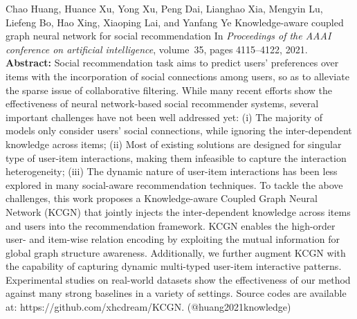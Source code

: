 \documentclass{article}
\begin{document}
\begin{thebibliography}{}
 Chao Huang, Huance Xu, Yong Xu, Peng Dai, Lianghao Xia, Mengyin Lu, Liefeng Bo, Hao Xing, Xiaoping Lai, and Yanfang Ye \newblock Knowledge-aware coupled graph neural network for social recommendation \newblock In {\em Proceedings of the AAAI conference on artificial intelligence}, volume~35, pages 4115--4122, 2021. \newblock \textbf{Abstract:} Social recommendation task aims to predict users' preferences over items with the incorporation of social connections among users, so as to alleviate the sparse issue of collaborative filtering. While many recent efforts show the effectiveness of neural network-based social recommender systems, several important challenges have not been well addressed yet: (i) The majority of models only consider users’ social connections, while ignoring the inter-dependent knowledge across items; (ii) Most of existing solutions are designed for singular type of user-item interactions, making them infeasible to capture the interaction heterogeneity; (iii) The dynamic nature of user-item interactions has been less explored in many social-aware recommendation techniques. To tackle the above challenges, this work proposes a Knowledge-aware Coupled Graph Neural Network (KCGN) that jointly injects the inter-dependent knowledge across items and users into the recommendation framework. KCGN enables the high-order user- and item-wise relation encoding by exploiting the mutual information for global graph structure awareness. Additionally, we further augment KCGN with the capability of capturing dynamic multi-typed user-item interactive patterns. Experimental studies on real-world datasets show the effectiveness of our method against many strong baselines in a variety of settings. Source codes are available at: https://github.com/xhcdream/KCGN. \newblock (@huang2021knowledge)


\end{thebibliography}
\end{document}
